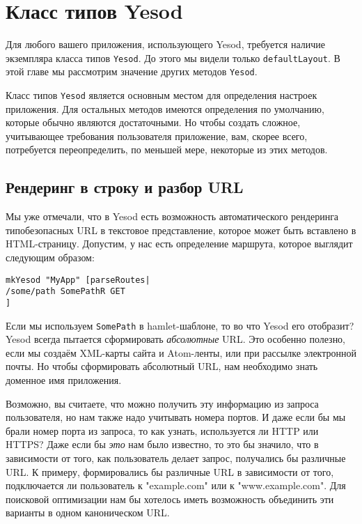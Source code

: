 \chapter {Класс типов Yesod}\label{ch:yesod-typeclass}

Для любого вашего приложения, использующего Yesod, требуется наличие экземпляра класса типов \lstinline!Yesod!. До этого мы видели только \lstinline!defaultLayout!. В этой главе мы рассмотрим значение других методов \lstinline!Yesod!.

Класс типов \lstinline!Yesod! является основным местом для определения настроек приложения. Для остальных методов имеются определения по умолчанию, которые обычно являются достаточными. Но чтобы создать сложное, учитывающее требования пользователя приложение, вам, скорее всего, потребуется переопределить, по меньшей мере, некоторые из этих методов.

\section {Рендеринг в строку и разбор URL}

Мы уже отмечали, что в Yesod есть возможность автоматического рендеринга типобезопасных URL в текстовое представление, которое может быть вставлено в HTML-страницу. Допустим, у нас есть определение маршрута, которое выглядит следующим образом:

\begin{lstlisting}
mkYesod "MyApp" [parseRoutes|
/some/path SomePathR GET
]
\end{lstlisting}

Если мы используем \lstinline!SomePath! в hamlet-шаблоне, то во что Yesod его отобразит? Yesod всегда пытается сформировать \emph{абсолютные} URL. Это особенно полезно, если мы создаём XML-карты сайта и Atom-ленты, или при рассылке электронной почты. Но чтобы сформировать абсолютный URL, нам необходимо знать доменное имя приложения.

Возможно, вы считаете, что можно получить эту информацию из запроса пользователя, но нам также надо учитывать номера портов. И даже если бы мы брали номер порта из запроса, то как узнать, используется ли HTTP или HTTPS? Даже если бы \emph{это} нам было известно, то это бы значило, что в зависимости от того, как пользователь делает запрос, получались бы различные URL. К примеру, формировались бы различные URL в зависимости от того, подключается ли пользователь к "example.com" или к "www.example.com". Для поисковой оптимизации нам бы хотелось иметь возможность объединить эти варианты в одном каноническом URL.

